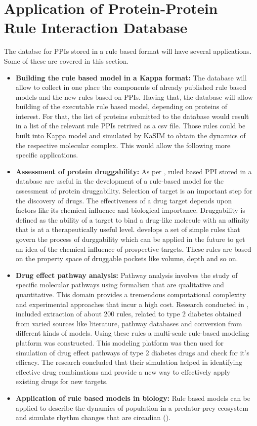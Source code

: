 \documentclass[msc,deptreport,ai]{infthesis}      %
\begin{document}
\section{Application of Protein-Protein Rule Interaction Database}
The databse for PPIs stored in a rule based format will have several applications. Some of these are covered in this section.
\begin{itemize}
	\item
	\textbf{Building the rule based model in a Kappa format:} The database will allow to collect in one place the components of already published rule based models and the new rules based on PPIs. Having that, the database will allow building of the executable rule based model, depending on proteins of interest. For that, the list of proteins submitted to the database would result in a list of the relevant rule PPIs retrived as a csv file. Those rules could be built into Kappa model and simulated by KaSIM to obtain the dynamics of the respective molecular complex. This would allow the following more specific applications.
	\item
	\textbf{Assessment of protein druggability:} As per \cite{druggability}, ruled based PPI stored in a database are useful in the development of a rule-based model for the assessment of protein druggability. Selection of target is an important step for the discovery of drugs. The effectiveness of a drug target depends upon factors like  its chemical influence and biological importance. Druggability is defined as the ability of a target to bind a drug-like molecule with an affinity that is at a therapeutically useful level. \cite{druggability} develops a set of simple rules that govern the process of durggability which can be applied in the future to get an idea of the chemical influence of prospective targets. These rules are based on the property space of druggable pockets like volume, depth and so on.
	\item 
	\textbf{Drug effect pathway analysis:} Pathway analysis involves the study of specific molecular pathways using formalism that are qualitative and quantitative. This domain provides a tremendous computational complexity and experimental approaches that incur a high cost. Research conducted in \cite{ruleMultiscale}, included extraction of about 200 rules, related to type 2 diabetes obtained from varied sources like literature, pathway databases and conversion from different kinds of models. Using these rules \cite{ruleMultiscale} a multi-scale rule-based modeling platform was constructed. This modeling platform was then used for simulation of drug effect pathways of type 2 diabetes drugs and check for it's efficacy. The research concluded that their simulation helped in identifying effective drug combinations and provide a new way to effectively apply existing drugs for new targets.
	\item
	\textbf{Application of rule based models in biology:} Rule based models can be applied to describe the dynamics of population in a predator-prey ecosystem and simulate rhythm changes that are circadian (\cite{rule_based}).
\end{itemize}
\end{document}
